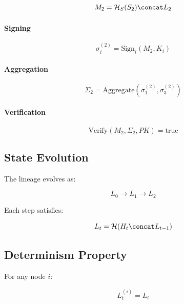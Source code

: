 \begin{equation}
M_2 = \mathcal{H}_S(S_2) \concat L_2
\end{equation}

\paragraph{Signing}

\begin{equation}
\sigma_i^{(2)} = \text{Sign}_i(M_2, K_i)
\end{equation}

\paragraph{Aggregation}

\begin{equation}
\Sigma_2 = \text{Aggregate}(\sigma_1^{(2)}, \sigma_3^{(2)})
\end{equation}

\paragraph{Verification}

\begin{equation}
\text{Verify}(M_2, \Sigma_2, PK) = \text{true}
\end{equation}

\subsection{State Evolution}

The lineage evolves as:

\begin{equation}
L_0 \rightarrow L_1 \rightarrow L_2
\end{equation}

Each step satisfies:

\begin{equation}
L_t = \mathcal{H}(H_t \concat L_{t-1})
\end{equation}

\subsection{Determinism Property}

For any node $i$:

\begin{equation}
L_t^{(i)} = L_t
\end{equation}

